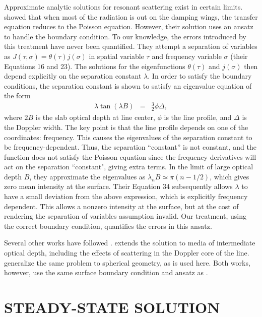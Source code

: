 \documentclass[linenumbers]{aastex63}
\newcommand{\be}{\begin{eqnarray}}
\newcommand{\ee}{\end{eqnarray}}
\begin{document}
Approximate analytic solutions for resonant scattering exist in certain limits. \citet{1973MNRAS.162...43H} showed that when most of the radiation is out on the damping wings, the transfer equation reduces to the Poisson equation. However, their solution uses an ansatz to handle the boundary condition. To our knowledge, the errors introduced by this treatment have never been quantified. They attempt a separation of variables as $J(\tau,\sigma) = \theta(\tau) j(\sigma)$ in spatial variable $\tau$ and frequency variable $\sigma$ (their Equations 16 and 23). The solutions for the eigenfunctions $\theta(\tau)$ and $j(\sigma)$ then depend explicitly on the separation constant $\lambda$. In order to satisfy the boundary conditions, the separation constant is shown to satisfy an eigenvalue equation of the form
\be
\lambda \tan(\lambda B) & = & \frac{3}{2} \phi \Delta,
\label{eq:evalue}
\ee
where $2B$ is the slab optical depth at line center, $\phi$ is the line profile, and $\Delta$ is the Doppler width. The key point is that the line profile depends on one of the coordinates: frequency. This causes the eigenvalues of the separation constant to be frequency-dependent. Thus, the separation ``constant'' is not constant, and the function does not satisfy the Poisson equation since the frequency derivatives will act on the separation ``constant", giving extra terms. In the limit of large optical depth $B$, they approximate the eigenvalues as $\lambda_n B \simeq \pi (n-1/2)$, which gives zero mean intensity at the surface. Their Equation 34 subsequently allows $\lambda$ to have a small deviation from the above expression, which is explicitly frequency dependent. This allows a nonzero intensity at the surface, but at the cost of rendering the separation of variables assumption invalid. Our treatment, using the correct boundary condition, quantifies the errors in this ansatz.

Several other works have followed \citet{1973MNRAS.162...43H}. \citet{1990ApJ...350..216N} extends the solution to media of intermediate optical depth, including the effects of scattering in the Doppler core of the line. \citet{2006ApJ...649...14D} generalize the same problem to spherical geometry, as is used here. Both works, however, use the same surface boundary condition and ansatz as \citet{1973MNRAS.162...43H}.

\section{STEADY-STATE SOLUTION}
\label{sec:steadystate}
\end{document}
